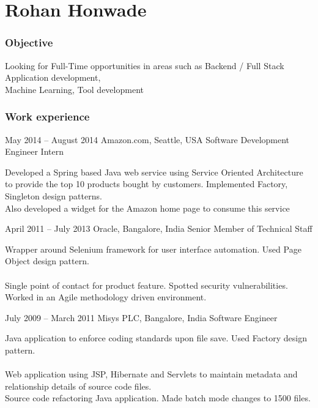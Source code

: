 \documentclass{tccv}
\begin{document}
\part{Rohan Honwade}


\section{Objective}
Looking for Full-Time opportunities in areas such as 
Backend / Full Stack Application development, \\Machine Learning, Tool development

\section{Work experience}
\begin{eventlist}
\item{May 2014 -- August 2014}
     {Amazon.com, Seattle, USA}
     {Software Development Engineer Intern}

Developed a Spring based Java web service using Service Oriented Architecture to provide the top 10 products bought by customers. Implemented Factory, Singleton design patterns.\\

Also developed a widget for the Amazon home page to consume this service


\item{April 2011 -- July 2013}
     {Oracle, Bangalore, India}
     {Senior Member of Technical Staff}

Wrapper around Selenium framework for user interface automation. Used Page Object design pattern.\\
\\

Single point of contact for product feature. Spotted security vulnerabilities. Worked in an Agile methodology driven environment.

\item{July 2009 -- March 2011}
     {Misys PLC, Bangalore, India}
     {Software Engineer}

Java application to enforce coding standards upon file save. Used Factory design pattern.\\
\\

Web application using JSP, Hibernate and Servlets to maintain metadata and relationship details of source code files.\\

Source code refactoring Java application. Made batch mode changes to 1500 files.\\
\\
\end{eventlist}
\end{document}
